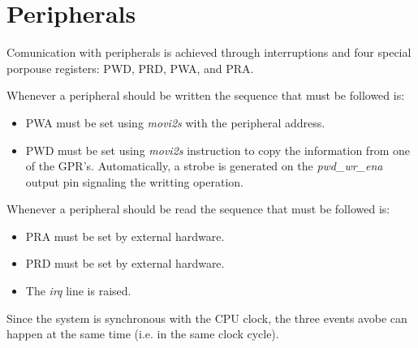 \section{Peripherals}
\label{sec:peripherals}
Comunication with peripherals is achieved through interruptions and four special porpouse registers: PWD, PRD, PWA, and PRA.

Whenever a peripheral should be written the sequence that must be followed is:
\begin{itemize}
 \item PWA must be set using \emph{movi2s} with the peripheral address.
 \item PWD must be set using \emph{movi2s} instruction to copy the information from one of the GPR's. Automatically,
       a strobe is generated on the \emph{pwd\_wr\_ena} output pin signaling the writting operation.
\end{itemize}

Whenever a peripheral should be read the sequence that must be followed is:
\begin{itemize}
 \item PRA must be set by external hardware.
 \item PRD must be set by external hardware.
 \item The \emph{irq} line is raised.
\end{itemize}
Since the system is synchronous with the CPU clock, the three events avobe can happen at the same time (i.e. in the
same clock cycle).
